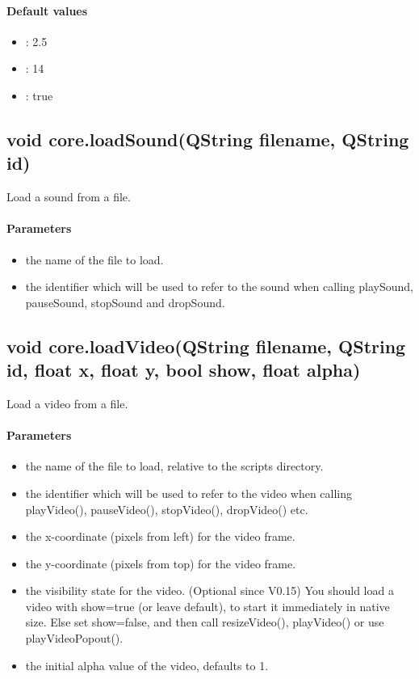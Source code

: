 \paragraph{Default values}
\begin{itemize}
\item {}: 2.5
\item {}: 14
\item {}: true
\end{itemize}

\subsection{void core.loadSound(QString filename, QString id)}
\label{sec:ScriptingAPI:core:loadSound}
Load a sound from a file.

\paragraph{Parameters}
\begin{itemize}
\item {} the name of the file to load.
\item {} the identifier which will be used to refer to the sound when calling playSound, pauseSound, stopSound and dropSound.
\end{itemize}

\subsection{void core.loadVideo(QString filename, QString id, float x, float y, bool show, float alpha)}
\label{sec:ScriptingAPI:core:loadVideo}
Load a video from a file.

\paragraph{Parameters}
\begin{itemize}
\item {} the name of the file to load, relative to the scripts directory.
\item {} the identifier which will be used to refer to the video when calling playVideo(), pauseVideo(), stopVideo(), dropVideo() etc.
\item {} the x-coordinate (pixels from left) for the video frame.
\item {} the y-coordinate (pixels from top) for the video frame.
\item {} the visibility state for the video. (Optional since V0.15) You should load a video with show=true (or leave default), to start it immediately in native size. Else set show=false, and then call resizeVideo(), playVideo() or use playVideoPopout().
\item {} the initial alpha value of the video, defaults to 1.
\end{itemize}

